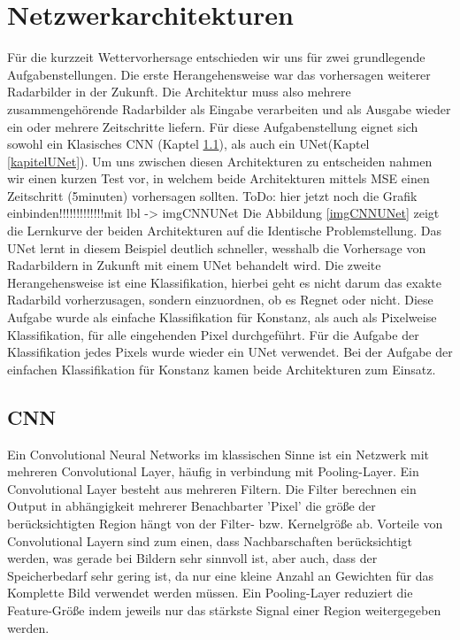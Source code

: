 \section{Netzwerkarchitekturen}
Für die kurzzeit Wettervorhersage entschieden wir uns für zwei grundlegende Aufgabenstellungen. Die erste Herangehensweise war das vorhersagen weiterer Radarbilder in der Zukunft. Die Architektur muss also mehrere zusammengehörende Radarbilder als Eingabe verarbeiten und als Ausgabe wieder ein oder mehrere Zeitschritte liefern. Für diese Aufgabenstellung eignet sich sowohl ein Klasisches CNN (Kaptel \ref{kapitelCNN}), als auch ein UNet(Kaptel \ref{kapitelUNet}). Um uns zwischen diesen Architekturen zu entscheiden nahmen wir einen kurzen Test vor, in welchem beide Architekturen mittels MSE einen Zeitschritt (5minuten) vorhersagen sollten. 
ToDo: hier jetzt noch die Grafik einbinden!!!!!!!!!!!!!mit lbl -> imgCNNUNet
Die Abbildung \ref{imgCNNUNet} zeigt die Lernkurve der beiden Architekturen auf die Identische Problemstellung. Das UNet lernt in diesem Beispiel deutlich schneller, wesshalb die Vorhersage von Radarbildern in Zukunft mit einem UNet behandelt wird.
Die zweite Herangehensweise ist eine Klassifikation, hierbei geht es nicht darum das exakte Radarbild vorherzusagen, sondern einzuordnen, ob es Regnet oder nicht. Diese Aufgabe wurde als einfache Klassifikation für Konstanz, als auch als Pixelweise Klassifikation, für alle eingehenden Pixel durchgeführt. Für die Aufgabe der Klassifikation jedes Pixels wurde wieder ein UNet verwendet. Bei der Aufgabe der einfachen Klassifikation für Konstanz kamen beide Architekturen zum Einsatz.

\subsection{CNN}
\label{kapitelCNN}
Ein Convolutional Neural Networks im klassischen Sinne ist ein Netzwerk mit mehreren Convolutional Layer, häufig in verbindung mit Pooling-Layer. Ein Convolutional Layer besteht aus mehreren Filtern. Die Filter berechnen ein Output in abhängigkeit mehrerer Benachbarter 'Pixel' die größe der berücksichtigten Region hängt von der Filter- bzw. Kernelgröße ab.
Vorteile von Convolutional Layern sind zum einen, dass Nachbarschaften berücksichtigt werden, was gerade bei Bildern sehr sinnvoll ist, aber auch, dass der Speicherbedarf sehr gering ist, da nur eine kleine Anzahl an Gewichten für das Komplette Bild verwendet werden müssen.
Ein Pooling-Layer reduziert die Feature-Größe indem jeweils nur das stärkste Signal einer Region weitergegeben werden.

